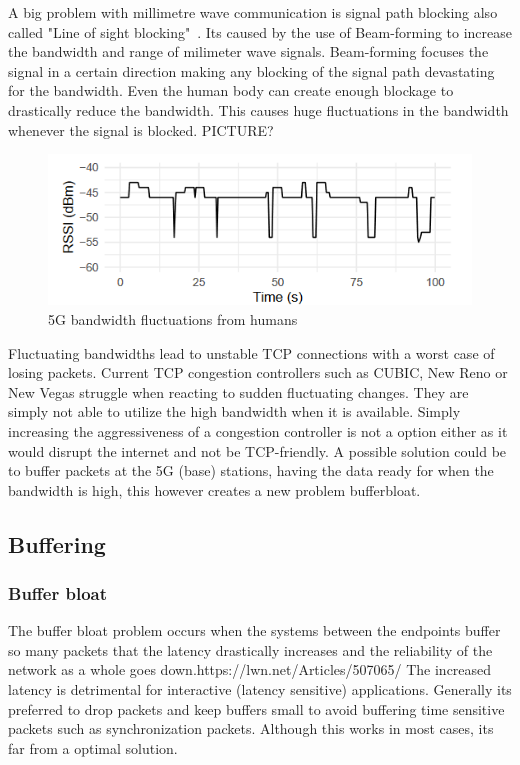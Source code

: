\documentclass[a4paper,english, 11pt]{report}
\begin{document}
A big problem with millimetre wave communication is signal path blocking also called "Line of sight blocking"~\cite{mmwave_blocking}. Its caused by the use of Beam-forming to increase the bandwidth and range of milimeter wave signals. Beam-forming focuses the signal in a certain direction making any blocking of the signal path devastating for the bandwidth. Even the human body can create enough blockage to drastically reduce the bandwidth. This causes huge fluctuations in the bandwidth whenever the signal is blocked. PICTURE?\\
\begin{figure} %
	\centering
	\includegraphics[scale=1.25]{../diagrams/graphs/tcp_mmwave_blockage.png}
  	\caption{5G bandwidth fluctuations from humans}
  	\label{fig:blockage}
\end{figure}

Fluctuating bandwidths lead to unstable TCP connections with a worst case of losing packets. Current TCP congestion controllers such as CUBIC, New Reno or New Vegas struggle when reacting to sudden fluctuating changes. They are simply not able to utilize the high bandwidth when it is available. Simply increasing the aggressiveness of a congestion controller is not a option either as it would disrupt the internet and not be TCP-friendly. A possible solution could be to buffer packets at the 5G (base) stations, having the data ready for when the bandwidth is high, this however creates a new problem bufferbloat.


\subsection{Buffering}
\subsubsection{Buffer bloat}
The buffer bloat problem occurs when the systems between the endpoints buffer so many packets that the latency drastically increases and the reliability of the network as a whole goes down.{https://lwn.net/Articles/507065/} The increased latency is detrimental for interactive (latency sensitive) applications. Generally its preferred to drop packets and keep buffers small to avoid buffering time sensitive packets such as synchronization packets. Although this works in most cases, its far from a optimal solution.\\\\
\end{document}

